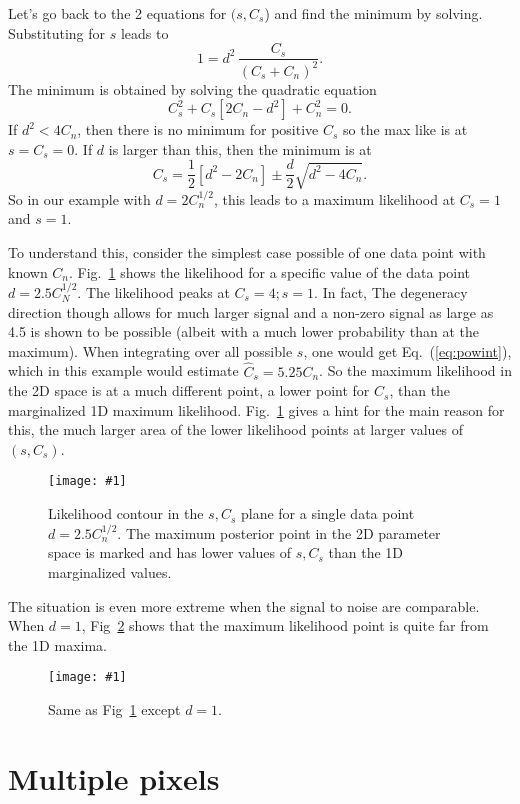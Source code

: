 \documentclass[11pt, oneside]{article}   	%
\def\be{\begin{equation}}
\def\ee{\end{equation}}
\newcommand{\ec}[1]{Eq.~(\ref{eq:#1})}
\newcommand{\sfig}[2]{
\texttt{[image: \#1]}
        }
\newcommand{\Spng}[2]{
   \begin{figure}[thbp]
   \begin{center}
    \sfig{#1.png}{0.9\columnwidth}
    \caption{{\small #2}}
    \label{fig:#1}
     \end{center}
   \end{figure}
}
\newcommand{\rf}[1]{\ref{fig:#1}}
\begin{document}
Let's go back to the 2 equations for $(s,C_s$) and find the minimum by solving. Substituting for $s$ leads to
\be
1 = d^2 \,\frac{C_s}{(C_s+C_n)^2}.\ee
The minimum is obtained by solving the quadratic equation
\be
C_s^2 + C_s\left[ 2C_n -d^2\right] +C_n^2 = 0.
\ee
If $d^2<4C_n$, then there is no minimum for positive $C_s$ so the max like is at $s=C_s=0$. If $d$ is larger than this, then the minimum is at 
\be
C_s = \frac12 \left[ d^2-2C_n\right] \pm \frac{d}2\sqrt{d^2-4C_n}
.\ee
So in our example with $d=2C_n^{1/2}$, this leads to a maximum likelihood at $C_s=1$ and $s=1$.

To understand this, consider the simplest case possible of one data point with known $C_n$. Fig.~\rf{l2.5} shows the likelihood for a specific value of the data point $d=2.5C_N^{1/2}$. The likelihood peaks at $C_s=4;s=1$. In fact, The degeneracy direction though allows for much larger signal and a non-zero signal as large as 4.5 is shown to be possible (albeit with a much lower probability than at the maximum). When integrating over all possible $s$, one would get \ec{powint}, which in this example would estimate $\hat C_s=5.25C_n$. 
So the maximum likelihood in the 2D space is at a much different point, a lower point for $C_s$, than the marginalized 1D maximum likelihood. Fig.~\rf{l2.5} gives a hint for the main reason for this, the much larger area of the lower likelihood points at larger values of $(s,C_s)$.
\Spng{l2.5}{Likelihood contour in the $s,C_s$ plane for a single data point $d=2.5C_n^{1/2}$. The maximum posterior point in the 2D parameter space is marked and has lower values of $s,C_s$ than the 1D marginalized values.}

The situation is even more extreme when the signal to noise are comparable. When $d=1$, Fig~\rf{l1} shows that the maximum likelihood point is quite far from the 1D maxima.
\Spng{l1}{Same as Fig~\rf{l2.5} except $d=1$.}

\section{Multiple pixels}
\end{document}
